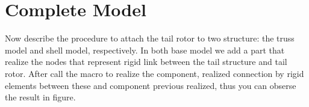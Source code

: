 \chapter{Complete Model}
Now describe the procedure to attach the tail rotor to two structure: the truss model and shell model, respectively.
In both base model we add a part that realize the nodes that represent rigid link between the tail structure and tail rotor.
After call the macro to realize the component, realized connection by rigid elements between these and component previous realized, thus you can obserse the result in figure.
